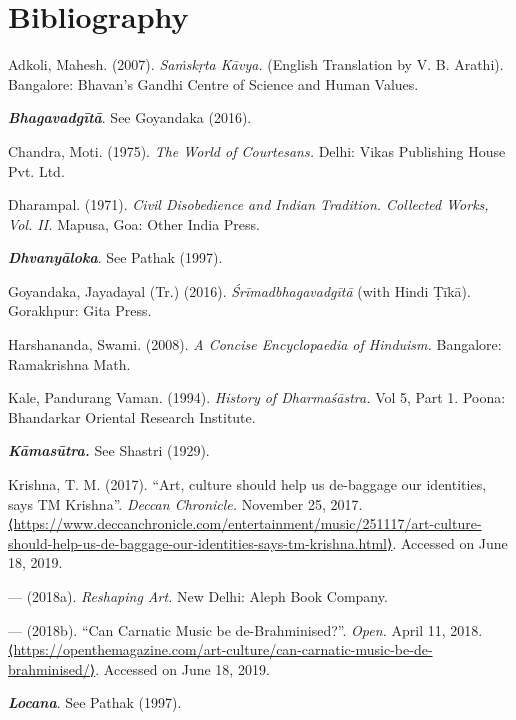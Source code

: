 \section*{Bibliography}

\begin{thebibliography}{99}
\itemsep=0pt

  Adkoli, Mahesh. (2007). \textit{Saṁskṛta Kāvya.} (English Translation by V. B. Arathi). Bangalore: Bhavan’s Gandhi Centre of Science and Human Values.

  \textit{\textbf{Bhagavadgītā}}. See Goyandaka (2016).

  Chandra, Moti. (1975). \textit{The World of Courtesans.} Delhi: Vikas Publishing House Pvt. Ltd.

  Dharampal. (1971). \textit{Civil Disobedience and Indian Tradition. Collected Works, Vol. II.} Mapusa, Goa: Other India Press.

  \textit{\textbf{Dhvanyāloka}}. See Pathak (1997).

  Goyandaka, Jayadayal (Tr.) (2016). \textit{Śrīmadbhagavadgītā} (with Hindi Ṭīkā). Gorakhpur: Gita Press.

  Harshananda, Swami. (2008). \textit{A Concise Encyclopaedia of Hinduism.} Bangalore: Ramakrishna Math.

  Kale, Pandurang Vaman. (1994). \textit{History of Dharmaśāstra.} Vol 5, Part 1. Poona: Bhandarkar Oriental Research Institute.

  \textit{\textbf{Kāmasūtra.}} See Shastri (1929).

  Krishna, T. M. (2017). “Art, culture should help us de-baggage our identities, says TM Krishna”. \textit{Deccan Chronicle.} November 25, 2017. \url{⟨https://www.deccanchronicle.com/entertainment/music/251117/art-culture-should-help-us-de-baggage-our-identities-says-tm-krishna.html⟩}. Accessed on June 18, 2019.

  — (2018a). \textit{Reshaping Art.} New Delhi: Aleph Book Company.

  — (2018b). “Can Carnatic Music be de-Brahminised?”. \textit{Open.} April 11, 2018. \url{⟨https://openthemagazine.com/art-culture/can-carnatic-music-be-de-brahminised/⟩}. Accessed on June 18, 2019.

  \textit{\textbf{Locana}}. See Pathak (1997).


\end{thebibliography}

